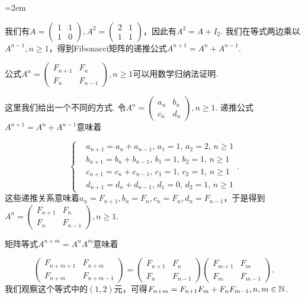 \begin{solution}
  \begin{enuma}\parindent=2em
    \item 我们有$A=\begin{pmatrix}
      1 & 1 \\
      1 & 0
    \end{pmatrix},A^2=\begin{pmatrix}
      2 & 1 \\
      1 & 1
    \end{pmatrix}$，因此有$A^2=A+I_2$. 我们在等式两边乘以$A^{n-1},n\ge1$，得到Fibonacci矩阵的递推公式$A^{n+1}=A^n+A^{n-1}$.
    \item 公式$A^n=\begin{pmatrix}
      F_{n+1} & F_n \\
      F_n & F_{n-1}
    \end{pmatrix},n\ge1$可以用数学归纳法证明.

    这里我们给出一个不同的方式. 令$A^n=\begin{pmatrix}
      a_n & b_n \\
      c_n & d_n
    \end{pmatrix},n\ge1$. 递推公式$A^{n+1}=A^n+A^{n-1}$意味着
  \end{enuma}
  \[
    \left\{
      \begin{aligned}
        & a_{n+1} = a_n + a_{n-1},\,a_1 = 1,\, a_2 = 2,\, n\ge1 \\
        & b_{n+1} = b_n + b_{n-1},\,b_1 = 1,\, b_2 = 1,\, n\ge1 \\
        & c_{n+1} = c_n + c_{n-1},\, c_1 = 1,\, c_2 = 1,\, n\ge1 \\
        & d_{n+1} = d_n + d_{n-1},\, d_1=0,\, d_2 = 1,\,n\ge1
      \end{aligned}
    \right..
  \]
  这些递推关系意味着$a_n=F_{n+1},b_n=F_n,c_n=F_n,d_n=F_{n-1}$，于是得到$A^n=\begin{pmatrix}
    F_{n+1} & F_n \\
    F_n & F_{n-1}
  \end{pmatrix},n\ge1$.

  \begin{enuma}\setcounter{enumi}{2}
    \item 矩阵等式$A^{n+m}=A^nA^m$意味着
  \end{enuma}
  \[
    \begin{pmatrix}
      F_{n+m+1} & F_{n+m} \\
      F_{n+m} & F_{n+m-1}
    \end{pmatrix} = \begin{pmatrix}
      F_{n+1} & F_n \\
      F_n & F_{n-1}
    \end{pmatrix}\begin{pmatrix}
      F_{m+1} & F_m \\
      F_m & F_{m-1}
    \end{pmatrix}.
  \]
  我们观察这个等式中的$(1,2)$元，可得$F_{n+m}=F_{n+1}F_m+F_nF_{m-1},n,m\in\mathbb N$.


\end{solution}
